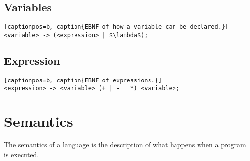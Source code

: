 \subsection{Variables}
\begin{lstlisting}[captionpos=b, caption{EBNF of how a variable can be declared.}]
<variable> -> (<expression> | $\lambda$);
\end{lstlisting}

\subsection{Expression}
\begin{lstlisting}[captionpos=b, caption{EBNF of expressions.}]
<expression> -> <variable> (+ | - | *) <variable>;
\end{lstlisting}

\section{Semantics}
The semantics of a language is the description of what happens when a program is executed.

